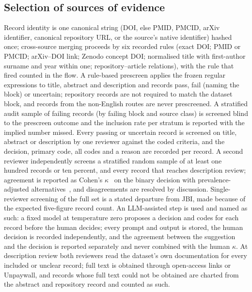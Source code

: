 \documentclass[11pt,a4paper]{article}
\begin{document}
\subsection{Selection of sources of evidence}\label{sec:selection}
Record identity is one canonical string (DOI, else PMID, PMCID, arXiv identifier, canonical repository URL, or the source's native identifier) hashed once; cross-source merging proceeds by six recorded rules (exact DOI; PMID or PMCID; arXiv--DOI link; Zenodo concept DOI; normalised title with first-author surname and year within one; repository--article relations), with the rule that fired counted in the flow. A rule-based prescreen applies the frozen regular expressions to title, abstract and description and records pass, fail (naming the block) or uncertain; repository records are not required to match the dataset block, and records from the non-English routes are never prescreened. A stratified audit sample of failing records (by failing block and source class) is screened blind to the prescreen outcome and the inclusion rate per stratum is reported with the implied number missed. Every passing or uncertain record is screened on title, abstract or description by one reviewer against the coded criteria, and the decision, primary code, all codes and a reason are recorded per record. A second reviewer independently screens a stratified random sample of at least one hundred records or ten percent, and every record that reaches description review; agreement is reported as Cohen's $\kappa$~\citep{cohen1960kappa} on the binary decision with prevalence-adjusted alternatives~\citep{byrt1993pabak,gwet2008ac1}, and disagreements are resolved by discussion. Single-reviewer screening of the full set is a stated departure from JBI, made because of the expected five-figure record count. An LLM-assisted step is used and named as such: a fixed model at temperature zero proposes a decision and codes for each record before the human decides; every prompt and output is stored, the human decision is recorded independently, and the agreement between the suggestion and the decision is reported separately and never combined with the human $\kappa$. At description review both reviewers read the dataset's own documentation for every included or unclear record; full text is obtained through open-access links or Unpaywall, and records whose full text could not be obtained are charted from the abstract and repository record and counted as such.
\end{document}

